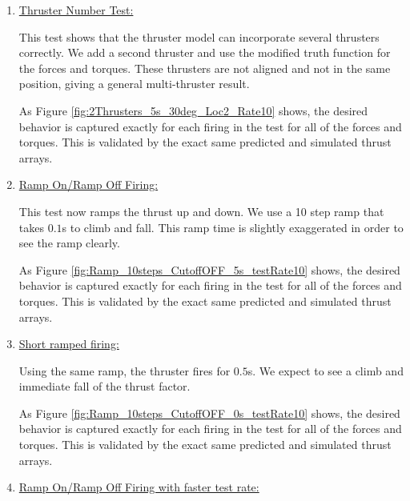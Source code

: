 \begin{enumerate}
	\item{\underline{Thruster Number Test:} }
	
	
	
	This test shows that the thruster model can incorporate several thrusters correctly. We add a second thruster and use the modified truth function for the forces and torques. These thrusters are not aligned and not in the same position, giving a general multi-thruster result.  
	
	
	
	As Figure \ref{fig:2Thrusters_5s_30deg_Loc2_Rate10} shows, the desired behavior is captured exactly for each 
	firing in the test for all of the forces and torques. This is validated by the exact same predicted and simulated thrust arrays.  
	
	\item{\underline{Ramp On/Ramp Off Firing:} }
	
	
	
	This test now ramps the thrust up and down. We use a 10 step ramp that takes $0.1$s to climb and fall. This ramp time is slightly exaggerated in order to see the ramp clearly.      
	
	
	As Figure \ref{fig:Ramp_10steps_CutoffOFF_5s_testRate10} shows, the desired behavior is captured exactly for each 
	firing in the test for all of the forces and torques. This is validated by the exact same predicted and simulated thrust arrays. 
	
	
	\item{\underline{Short ramped firing:} }
	
	
	
	Using the same ramp, the thruster fires for $0.5$s. We expect to see a climb and immediate fall of the thrust factor.
	
	
	
	As Figure \ref{fig:Ramp_10steps_CutoffOFF_0s_testRate10} shows, the desired behavior is captured exactly for each 
	firing in the test for all of the forces and torques. This is validated by the exact same predicted and simulated thrust arrays. 
	
	\item{\underline{Ramp On/Ramp Off Firing with faster test rate:} }
	

\end{enumerate}
